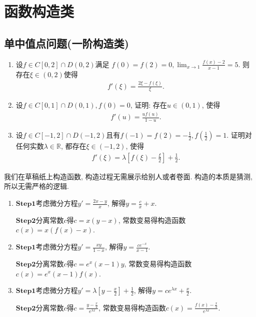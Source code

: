 \documentclass[../../main.tex]{subfiles}
\begin{document}
\section{函数构造类}

\subsection{单中值点问题(一阶构造类)}\label{section单中值点问题}

\begin{example}
\begin{enumerate}
\item 设\(f\in C[0,2]\cap D(0,2)\)满足
\(f(0)=f(2)=0,\lim_{x\rightarrow 1}\frac{f(x)-2}{x - 1}=5\).
则存在\(\xi\in(0,2)\)使得
\begin{align*}
f'(\xi)=\frac{2\xi - f(\xi)}{\xi}.
\end{align*}

\item 设\(f\in C[0,1]\cap D(0,1),f(0)=0\), 证明: 存在\(u\in(0,1)\), 使得
\begin{align*}
f'(u)=\frac{uf(u)}{1 - u}.
\end{align*}

\item 设\(f\in C[-1,2]\cap D(-1,2)\)且有\(f(-1)=f(2)=-\frac{1}{2},f(\frac{1}{2}) = 1\). 证明对任何实数\(\lambda\in\mathbb{R}\), 都存在\(\xi\in(-1,2)\), 使得
\begin{align*}
f'(\xi)=\lambda\left[f(\xi)-\frac{\xi}{2}\right]+\frac{1}{2}.
\end{align*}
\end{enumerate}
\end{example}
\begin{note}
我们在草稿纸上构造函数, 构造过程无需展示给别人或者卷面. 构造的本质是猜测, 所以无需严格的逻辑.
\end{note}
\begin{remark}
\begin{enumerate}
\item $\mathbf{Step}\mathbf{1}$考虑微分方程\(y'=\frac{2x - y}{x}\), 解得\(y=\frac{c}{x}+x\).

$\mathbf{Step}\mathbf{2}$分离常数\(c\)得\(c = x(y - x)\), 常数变易得构造函数\(c(x)=x(f(x)-x)\).

\item $\mathbf{Step}\mathbf{1}$考虑微分方程\(y'=\frac{xy}{1 - x}\), 解得\(y=\frac{ce^{-x}}{x - 1}\).

$\mathbf{Step}\mathbf{2}$分离常数\(c\)得\(c = e^{x}(x - 1)y\), 常数变易得构造函数\(c(x)=e^{x}(x - 1)f(x)\).

\item $\mathbf{Step}\mathbf{1}$考虑微分方程\(y'=\lambda\left[y-\frac{x}{2}\right]+\frac{1}{2}\), 解得\(y = ce^{\lambda x}+\frac{x}{2}\).

$\mathbf{Step}\mathbf{2}$分离常数\(c\)得\(c=\frac{y-\frac{x}{2}}{e^{\lambda x}}\), 常数变易得构造函数\(c(x)=\frac{f(x)-\frac{x}{2}}{e^{\lambda x}}\).
\end{enumerate}
\end{remark}
\end{document}

